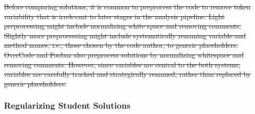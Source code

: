 \documentclass[12pt,twoside]{mitthesis}
\providecommand{\DIFdeltex}[1]{{\protect\color{red}\sout{#1}}}                      %
\providecommand{\DIFaddbegin}{} %
\providecommand{\DIFaddend}{} %
\providecommand{\DIFdelbegin}{} %
\providecommand{\DIFdelend}{} %
\providecommand{\DIFdel}[1]{\texorpdfstring{\DIFdeltex{#1}}{}} %
\begin{document}

\DIFdelbegin %
\DIFdel{Before comparing solutions, it is common to preprocess the code to remove token variability that is irrelevant to later stages in the analysis pipeline. Light preprocessing might include normalizing white space and removing comments. Slightly more preprocessing might include systematically renaming variable and method names, i.e., those chosen by the code author, to generic placeholders. OverCode and Foobaz also preprocess solutions by normalizing whitespace and removing comments. However, since variables are central to the both systems, variables are carefully tracked and strategically renamed, rather than replaced by generic placeholders.
}\DIFdelend %

\DIFaddbegin \subsubsection{Regularizing Student Solutions}
\DIFaddend 
\end{document}
